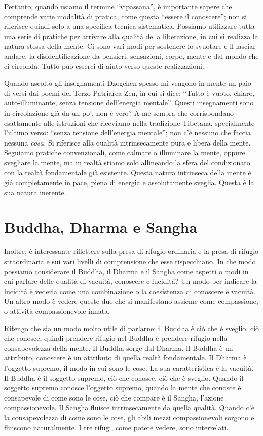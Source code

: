Pertanto, quando usiamo il termine ``vipassanā'', è importante sapere che comprende varie modalità di pratica, come questa ``essere il conoscere''; non si riferisce quindi solo a una specifica tecnica sistematica. Possiamo utilizzare tutta una serie di pratiche per arrivare alla qualità della liberazione, in cui si realizza la natura stessa della mente. Ci sono vari modi per sostenere lo svuotare e il lasciar andare, la disidentificazione da pensieri, sensazioni, corpo, mente e dal mondo che ci circonda. Tutto può esserci di aiuto verso queste realizzazioni. 

Quando ascolto gli insegnamenti Dzogchen spesso mi vengono in mente un paio di versi dai poemi del Terzo Patriarca Zen, in cui si dice: ``Tutto è vuoto, chiaro, auto-illuminante, senza tensione dell'energia mentale''. Questi insegnamenti sono in circolazione già da un po', non è vero? A me sembra che corrispondano esattamente alle istruzioni che riceviamo nella tradizione Tibetana, specialmente l'ultimo verso: ``senza tensione dell'energia mentale''; non c'è nessuno che faccia nessuna \textit{cosa.} Si riferisce alla qualità intrinsecamente pura e libera della mente. Seguiamo pratiche convenzionali, come calmare o illuminare la mente, oppure svegliare la mente, ma in realtà stiamo solo allineando la sfera del condizionato con la realtà fondamentale già esistente. Questa natura intrinseca della mente è già completamente in pace, piena di energia e assolutamente sveglia. Questa è la sua natura inerente.

\section*{Buddha, Dharma e Sangha}

Inoltre, è interessante riflettere sulla presa di rifugio ordinaria e la presa di rifugio straordinaria e sui vari livelli di comprensione che esse rispecchiano. In che modo possiamo considerare il Buddha, il Dharma e il Sangha come aspetti o modi in cui parlare delle qualità di vacuità, conoscere e lucidità? Un modo per indicare la lucidità è vederla come una combinazione o la coesistenza di conoscere e vacuità. Un altro modo è vedere queste due che si manifestano assieme come compassione, o attività compassionevole innata. 

Ritengo che sia un modo molto utile di parlarne: il Buddha è ciò che è sveglio, ciò che conosce, quindi prendere rifugio nel Buddha è prendere rifugio nella consapevolezza della mente. Il Buddha sorge dal Dharma. Il Buddha è un attributo, conoscere è un attributo di quella realtà fondamentale. Il Dharma è l'oggetto supremo, il modo in cui sono le cose. La sua caratteristica è la vacuità. Il Buddha è il soggetto supremo, ciò che conosce, ciò che è sveglio. Quando il soggetto supremo conosce l'oggetto supremo, quando la mente che conosce è consapevole di come sono le cose, ciò che compare è il Sangha, l'azione compassionevole. Il Sangha fluisce intrinsecamente da quella qualità. Quando c'è la consapevolezza di come sono le cose, gli abili mezzi compassionevoli sorgono e fluiscono naturalmente. I tre rifugi, come potete vedere, sono interrelati.

